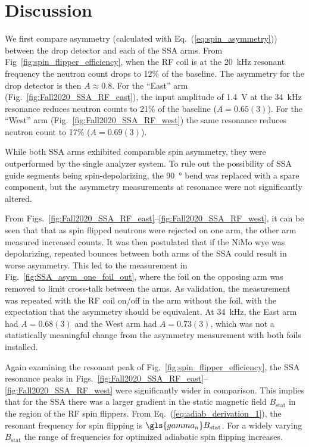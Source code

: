 
\section{Discussion}


We first compare asymmetry (calculated with Eq.~(\ref{eq:spin_asymmetry})) between the drop detector and each of the SSA arms. From Fig~\ref{fig:spin_flipper_efficiency}, when the RF coil is at the \qty{20}{kHz} resonant frequency the neutron count drops to 12\% of the baseline. The asymmetry for the drop detector is then $A\approx 0.8$. For the ``East'' arm (Fig.~\ref{fig:Fall2020_SSA_RF_east}), the input amplitude of \qty{1.4}{V} at the \qty{34}{kHz} resonance reduces neutron counts to 21\% of the baseline ($A=0.65(3)$). For the ``West'' arm (Fig.~\ref{fig:Fall2020_SSA_RF_west}) the same resonance reduces neutron count to 17\% ($A=0.69(3)$). 

While both SSA arms exhibited comparable spin asymmetry, they were outperformed by the single analyzer system. To rule out the possibility of SSA guide segments being spin-depolarizing, the \qty{90}{\degree} bend was replaced with a spare component, but the asymmetry measurements at resonance were not significantly altered.

From Figs.~\ref{fig:Fall2020_SSA_RF_east}--\ref{fig:Fall2020_SSA_RF_west}, it can be seen that that as spin flipped neutrons were rejected on one arm, the other arm measured increased counts. It was then postulated that if the NiMo wye was depolarizing, repeated \ucn bounces between both arms of the SSA could result in worse asymmetry. This led to the measurement in Fig.~\ref{fig:SSA_asym_one_foil_out}, where the foil on the opposing arm was removed to limit cross-talk between the arms. As validation, the measurement was repeated with the RF coil on/off in the arm without the foil, with the expectation that the asymmetry should be equivalent. At \qty{34}{kHz}, the East arm had $A=0.68(3)$ and the West arm had $A=0.73(3)$, which was not a statistically meaningful change from the asymmetry measurement with both foils installed.

Again examining the resonant peak of Fig.~\ref{fig:spin_flipper_efficiency}, the SSA resonance peaks in Figs.~\ref{fig:Fall2020_SSA_RF_east}--\ref{fig:Fall2020_SSA_RF_west} were significantly wider in comparison. This implies that for the SSA there was a larger gradient in the static magnetic field $B_\text{stat}$ in the region of the RF spin flippers. From Eq.~(\ref{eq:adiab_derivation_1}), the resonant frequency for spin flipping is $\gls{gamma_n} B_\text{stat}$. For a widely varying $B_\text{stat}$ the range of frequencies for optimized adiabatic spin flipping increases.

